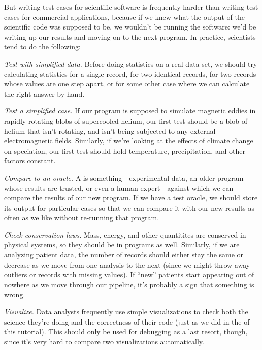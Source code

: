 \documentclass{book}
\begin{document}
But writing test cases for scientific software is frequently harder than
writing test cases for commercial applications, because if we knew what
the output of the scientific code was supposed to be, we wouldn't be
running the software: we'd be writing up our results and moving on to
the next program. In practice, scientists tend to do the following:

\begin{swcenumerate}
\item
  \emph{Test with simplified data.} Before doing statistics on a real
  data set, we should try calculating statistics for a single record,
  for two identical records, for two records whose values are one step
  apart, or for some other case where we can calculate the right answer
  by hand.
\item
  \emph{Test a simplified case.} If our program is supposed to simulate
  magnetic eddies in rapidly-rotating blobs of supercooled helium, our
  first test should be a blob of helium that isn't rotating, and isn't
  being subjected to any external electromagnetic fields. Similarly, if
  we're looking at the effects of climate change on speciation, our
  first test should hold temperature, precipitation, and other factors
  constant.
\item
  \emph{Compare to an oracle.} A 
  is something---experimental data, an older program whose results are
  trusted, or even a human expert---against which we can compare the
  results of our new program. If we have a test oracle, we should store
  its output for particular cases so that we can compare it with our new
  results as often as we like without re-running that program.
\item
  \emph{Check conservation laws.} Mass, energy, and other quantitites
  are conserved in physical systems, so they should be in programs as
  well. Similarly, if we are analyzing patient data, the number of
  records should either stay the same or decrease as we move from one
  analysis to the next (since we might throw away outliers or records
  with missing values). If ``new'' patients start appearing out of
  nowhere as we move through our pipeline, it's probably a sign that
  something is wrong.
\item
  \emph{Visualize.} Data analysts frequently use simple visualizations
  to check both the science they're doing and the correctness of their
  code (just as we did in the  of
  this tutorial). This should only be used for debugging as a last
  resort, though, since it's very hard to compare two visualizations
  automatically.
\end{swcenumerate}
\end{document}
